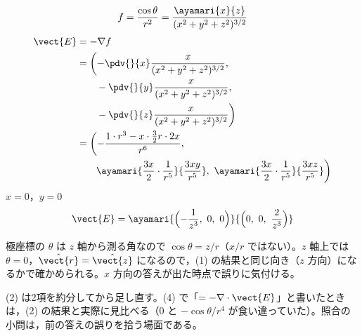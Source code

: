 \[ f=\frac{\cos\theta}{r^{2}}=\frac{\ayamari{x}{z}}{(x^{2}+y^{2}+z^{2})^{3/2}} \]
\begin{align*}
\vect{E}&=-\nabla f\\
&=\biggl(-\pdv{}{x}\frac{x}{(x^{2}+y^{2}+z^{2})^{3/2}},\\
&\qquad-\pdv{}{y}\frac{x}{(x^{2}+y^{2}+z^{2})^{3/2}},\\
&\qquad-\pdv{}{z}\frac{x}{(x^{2}+y^{2}+z^{2})^{3/2}}\biggr)\\
&=\biggl(-\frac{1\cdot r^{3}-x\cdot\frac{3}{2}r\cdot2x}{r^{6}},\\
&\qquad\ayamari{\frac{3x}{2}\cdot\frac{1}{r^{5}}}{\frac{3xy}{r^{5}}},\ \ayamari{\frac{3x}{2}\cdot\frac{1}{r^{5}}}{\frac{3xz}{r^{5}}}\biggr)
\end{align*}
$x=0$，$y=0$
\[ \vect{E}=\ayamari{\Bigl(-\frac{1}{z^{3}},\ 0,\ 0\Bigr)}{\Bigl(0,\ 0,\ \frac{2}{z^{3}}\Bigr)} \]
\item 極座標の $\theta$ は $z$ 軸から測る角なので $\cos\theta=z/r$（$x/r$ ではない）。$z$ 軸上では $\theta=0$，$\hat{\vect{r}}=\hat{\vect{z}}$ になるので，(1) の結果と同じ向き（$z$ 方向）になるかで確かめられる。$x$ 方向の答えが出た時点で誤りに気付ける。
\item (2) は2項を約分してから足し直す。(4) で「$=-\nabla\cdot\vect{E}$」と書いたときは，(2) の結果と実際に見比べる（$0$ と $-\cos\theta/r^{4}$ が食い違っていた）。照合の小問は，前の答えの誤りを拾う場面である。
